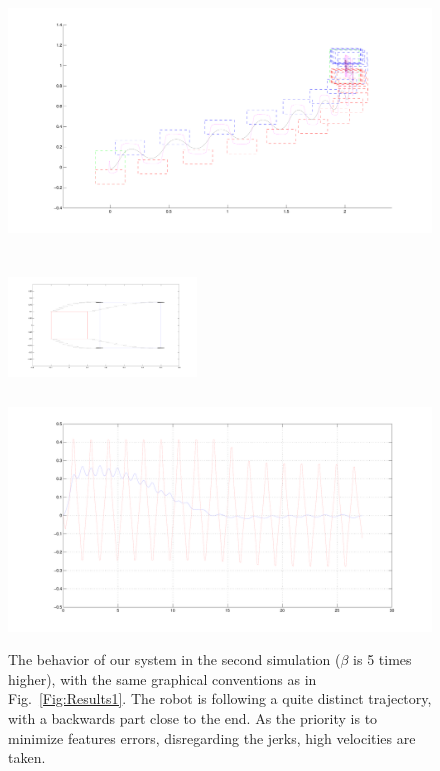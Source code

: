 \begin{figure}[h]
\begin{minipage}{0.5\textwidth}
 \centering
 \includegraphics[scale=.25]{Chap4-Visual-Servoing/steps2_hrp2.pdf}
\end{minipage}
\begin{minipage}{0.5\textwidth}
 \centering
 \includegraphics[width=5cm,height=4cm]{Chap4-Visual-Servoing/features2_hrp2.pdf}
\\
 \includegraphics[scale=.2]{Chap4-Visual-Servoing/vels2_hrp2.pdf}
\end{minipage}
 \caption[]{\label{Fig:Results2}\small{The behavior of our system in the second simulation ($\beta$ is 5 times higher), with the same graphical conventions as in Fig.~\ref{Fig:Results1}. The robot is following a quite distinct trajectory, with a backwards part close to the end. As the priority is to minimize features errors, disregarding the jerks, high velocities are taken.}}
 \end{figure}

